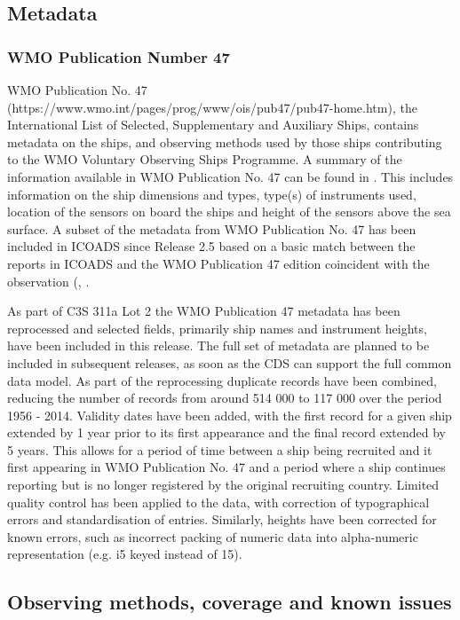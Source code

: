 \FloatBarrier
\subsection{Metadata}
\subsubsection{WMO Publication Number 47}
WMO Publication No. 47 (https://www.wmo.int/pages/prog/www/ois/pub47/pub47-home.htm), the International List of Selected, Supplementary and Auxiliary Ships, contains metadata on the ships, and observing methods used by those ships contributing to the WMO Voluntary Observing Ships Programme. 
A summary of the information available in WMO Publication No. 47 can be found in \cite{Kent2007}. 
This includes information on the ship dimensions and types, type(s) of instruments used, location of the sensors on board the ships and height of the sensors above the sea surface.  
A subset of the metadata from WMO Publication No. 47 has been included in ICOADS since Release 2.5 based on a basic match between the reports in ICOADS and the WMO Publication 47 edition coincident with the observation (\cite{Kent2007}, \cite{Woodruff2011}.

As part of C3S 311a Lot 2 the WMO Publication 47 metadata has been reprocessed and selected fields, primarily ship names and instrument heights, have been included in this release. 
The full set of metadata are planned to be included in subsequent releases, as soon as the CDS can support the full common data model. 
As part of the reprocessing duplicate records have been combined, reducing the number of records from around 514 000 to 117 000 over the period 1956 - 2014. 
Validity dates have been added, with the first record for a given ship extended by 1 year prior to its first appearance and the final record extended by 5 years. 
This allows for a period of time between a ship being recruited and it first appearing in WMO Publication No. 47 and a period where a ship continues reporting but is no longer registered by the original recruiting country. 
Limited quality control has been applied to the data, with correction of typographical errors and standardisation of entries. 
Similarly, heights have been corrected for known errors, such as incorrect packing of numeric data into alpha-numeric representation (e.g. i5 keyed instead of 15). 


\FloatBarrier
\subsection{Observing methods, coverage and known issues}
